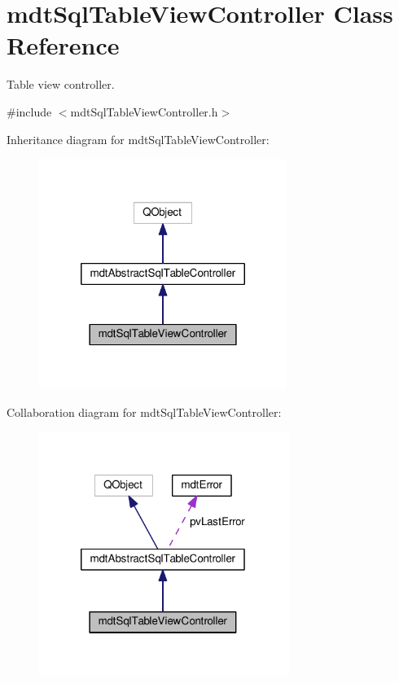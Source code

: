 \hypertarget{classmdt_sql_table_view_controller}{\section{mdt\-Sql\-Table\-View\-Controller Class Reference}
\label{classmdt_sql_table_view_controller}
}


Table view controller.  




{\ttfamily \#include $<$mdt\-Sql\-Table\-View\-Controller.\-h$>$}



Inheritance diagram for mdt\-Sql\-Table\-View\-Controller\-:\nopagebreak
\begin{figure}[H]
\begin{center}
\leavevmode
\includegraphics[width=228pt]{classmdt_sql_table_view_controller__inherit__graph}
\end{center}
\end{figure}


Collaboration diagram for mdt\-Sql\-Table\-View\-Controller\-:\nopagebreak
\begin{figure}[H]
\begin{center}
\leavevmode
\includegraphics[width=230pt]{classmdt_sql_table_view_controller__coll__graph}
\end{center}
\end{figure}
